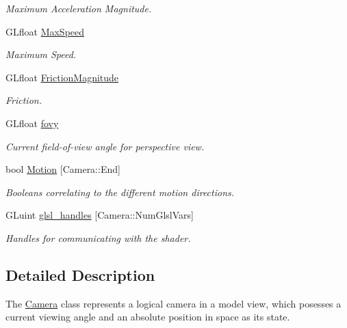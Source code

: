 \begin{DoxyCompactItemize}
\begin{DoxyCompactList}\small\item\em Maximum Acceleration Magnitude. \end{DoxyCompactList}\item 
\hypertarget{class_camera_a4e6866298a8e7a1ff2f529202892958e}{G\-Lfloat \hyperlink{class_camera_a4e6866298a8e7a1ff2f529202892958e}{Max\-Speed}}\label{class_camera_a4e6866298a8e7a1ff2f529202892958e}

\begin{DoxyCompactList}\small\item\em Maximum Speed. \end{DoxyCompactList}\item 
G\-Lfloat \hyperlink{class_camera_a4260507a4e59b2b079a0e1c6a5b64d5c}{Friction\-Magnitude}
\begin{DoxyCompactList}\small\item\em Friction. \end{DoxyCompactList}\item 
G\-Lfloat \hyperlink{class_camera_acc8b97facc57059530efad534c2f8314}{fovy}
\begin{DoxyCompactList}\small\item\em Current field-\/of-\/view angle for perspective view. \end{DoxyCompactList}\item 
bool \hyperlink{class_camera_a39746b4fadf30bba6bdc8aa6acfdc6f2}{Motion} \mbox{[}Camera\-::\-End\mbox{]}
\begin{DoxyCompactList}\small\item\em Booleans correlating to the different motion directions. \end{DoxyCompactList}\item 
G\-Luint \hyperlink{class_camera_a1635486d7f9e0d52b241899a270ee335}{glsl\-\_\-handles} \mbox{[}Camera\-::\-Num\-Glsl\-Vars\mbox{]}
\begin{DoxyCompactList}\small\item\em Handles for communicating with the shader. \end{DoxyCompactList}\end{DoxyCompactItemize}


\subsection{Detailed Description}
The \hyperlink{class_camera}{Camera} class represents a logical camera in a model view, which posesses a current viewing angle and an absolute position in space as its state. 

